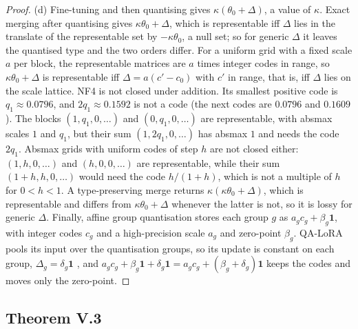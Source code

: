 \begin{proof}
(d) Fine-tuning and then quantising gives $\kappa(\theta_0+\Delta)$, a value of $\kappa$. Exact merging after quantising gives
$\kappa\theta_0+\Delta$, which is representable iff $\Delta$ lies in the translate of the representable set by
$-\kappa\theta_0$, a null set; so for generic $\Delta$ it leaves the quantised type and the two orders differ. For a uniform
grid with a fixed scale $a$ per block, the representable matrices are $a$ times integer codes in range, so
$\kappa\theta_0+\Delta$ is representable iff $\Delta=a(c'-c_0)$ with $c'$ in range, that is, iff $\Delta$ lies on the scale
lattice. NF4 is not closed under addition. Its smallest positive code is $q_1\approx0.0796$, and $2q_1\approx0.1592$ is not a
code (the next codes are $0.0796$ and $0.1609$). The blocks $(1,q_1,0,\dots)$ and $(0,q_1,0,\dots)$ are representable,
with absmax scales $1$ and $q_1$, but their sum $(1,2q_1,0,\dots)$ has absmax $1$ and needs the code $2q_1$. Absmax grids
with uniform codes of step $h$ are not closed either: $(1,h,0,\dots)$ and $(h,0,0,\dots)$ are representable, while their sum
$(1+h,h,0,\dots)$ would need the code $h/(1+h)$, which is not a multiple of $h$ for $0<h<1$. A type-preserving merge
returns $\kappa(\kappa\theta_0+\Delta)$, which is representable and differs from $\kappa\theta_0+\Delta$ whenever the latter
is not, so it is lossy for generic $\Delta$. Finally, affine group quantisation stores each group $g$ as $a_gc_g+\beta_g\mathbf
1$, with integer codes $c_g$ and a high-precision scale $a_g$ and zero-point $\beta_g$. QA-LoRA pools its input over the
quantisation groups, so its update is constant on each group, $\Delta_g=\delta_g\mathbf 1$ \citep{xu2023qa}, and
$a_gc_g+\beta_g\mathbf 1+\delta_g\mathbf 1=a_gc_g+(\beta_g+\delta_g)\mathbf 1$ keeps the codes and moves only the zero-point.
\end{proof}

\subsection{Theorem V.3}\label{proof:V.3}

